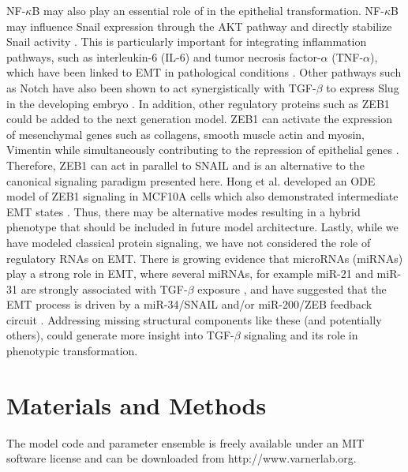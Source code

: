 \documentclass[11pt,letterpaper]{article}
\begin{document}
NF-$\kappa$B may also play an essential role of in the epithelial transformation.
NF-$\kappa$B may influence Snail expression through the AKT pathway and directly stabilize Snail activity \cite{Wu:2009cr}.  This is particularly important for integrating inflammation pathways, such as interleukin-6 (IL-6) and tumor necrosis factor-$\alpha$ (TNF-$\alpha$), which have been linked to EMT in pathological conditions \cite{Sullivan:2009bh}.
Other pathways such as Notch have also been shown to act synergistically with TGF-$\beta$ to express Slug in the developing embryo \cite{Niessen:2008nx}.
In addition, other regulatory proteins such as ZEB1 could be added to the next generation model.
ZEB1 can activate the expression of mesenchymal genes such as collagens, smooth muscle actin and myosin, Vimentin while simultaneously contributing
to the repression of epithelial genes \cite{Liu:2008aa}.
Therefore, ZEB1 can act in parallel to SNAIL and is an alternative to the canonical signaling paradigm presented here.
Hong et al. developed an ODE model of ZEB1 signaling in MCF10A cells which also demonstrated intermediate EMT states \cite{Hong:2015aa}.
Thus, there may be alternative modes resulting in a hybrid phenotype that should be included in future model architecture.
Lastly, while we have modeled classical protein signaling, we have not considered the role of regulatory RNAs on EMT.
There is growing evidence that microRNAs (miRNAs) play a strong role in EMT, where several miRNAs,
for example miR-21 and miR-31 are strongly associated with TGF-$\beta$ exposure \cite{Bullock:2012aa}, and have suggested that
the EMT process is driven by a miR-34/SNAIL and/or miR-200/ZEB feedback circuit \cite{Lu:2013aa,Zhang:2014aa,Tian:2013aa}.
Addressing missing structural components like these (and potentially others), could generate more insight into TGF-$\beta$ signaling and its role in phenotypic transformation.

\clearpage

\section*{Materials and Methods}
The model code and parameter ensemble is freely available under an MIT software license and can be downloaded from http://www.varnerlab.org.
\end{document}
